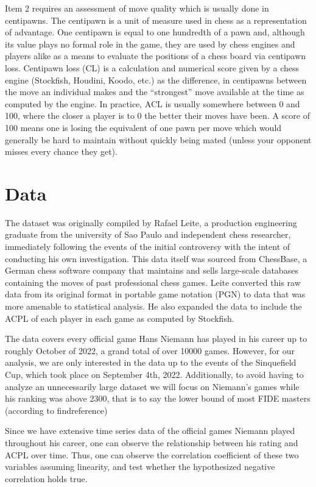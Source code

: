 \documentclass[12pt, letterpaper, titlepage]{article}
\begin{document}
Item 2 requires an assessment of move quality which is usually done in centipawns. The centipawn is a unit of measure used in chess as a representation of advantage. One centipawn is equal to one hundredth of a pawn and, although its value plays no formal role in the game, they are used by chess engines and players alike as a means to evaluate the positions of a chess board via centipawn loss. Centipawn loss (CL) is a calculation and numerical score given by a chess engine  (Stockfish, Houdini, Koodo, etc.) as the difference, in centipawns between the move an individual makes and the “strongest” move available at the time as computed by the engine.
In practice, ACL is usually somewhere between 0 and 100, where the closer a player is to 0 the better their moves have been. A score of 100 means one is losing the equivalent of one pawn per move which would generally be hard to maintain without quickly being mated (unless your opponent misses every chance they get).

\section*{Data}
\label{sec:data}

The dataset was originally compiled by Rafael Leite, a production engineering graduate from the university of Sao Paulo and independent chess researcher, immediately following the events of the initial controversy with the intent of conducting his own investigation. This data itself was sourced from ChessBase, a German chess software company that maintains and sells large-scale databases containing the moves of past professional chess games. Leite converted this raw data from its original format in portable game notation (PGN) to data that was more amenable to statistical analysis. He also expanded the data to include the ACPL of each player in each game as computed by Stockfish.

The data covers every official game Hans Niemann has played in his career up to roughly October of 2022, a grand total of over 10000 games. However, for our analysis, we are only interested in the data up to the events of the Sinquefield Cup, which took place on September 4th, 2022. Additionally, to avoid having to analyze an unnecessarily large dataset we will focus on Niemann's games while his ranking was above 2300, that is to say the lower bound of most FIDE masters (according to findreference)

Since we have extensive time series data of the official games Niemann played throughout his career, one can observe the relationship between his rating and ACPL over time. Thus, one can observe the correlation coefficient of these two variables assuming linearity, and test whether the hypothesized negative correlation holds true.
\end{document}
